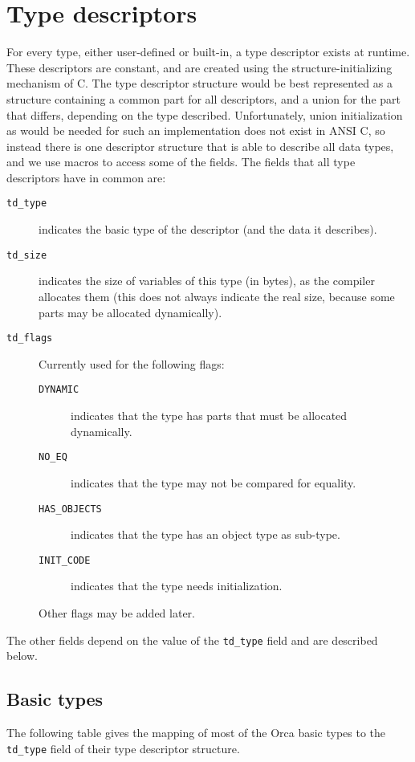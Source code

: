 \documentclass[10pt]{article}
\begin{document}
\section{Type descriptors}\label{sec:tpdesc}

For every type, either user-defined or built-in,
a type descriptor exists at runtime.
These descriptors are constant,
and are created using the structure-initializing mechanism of C.
The type descriptor structure would be best represented as a structure
containing a common part for all descriptors, and a union for the
part that differs, depending on the type described.
Unfortunately, union initialization as would be needed for 
such an implementation does not exist in
ANSI C, so instead there is one descriptor structure that is able to
describe all data types,
and we use macros to access some of the fields.
The fields that all type descriptors have in common are:
\begin{description}
\item[{\tt td\_type}]
indicates the basic type of the descriptor
(and the data it describes).
\item[{\tt td\_size}]
indicates the size of variables of this type (in bytes), as the compiler
allocates them (this does not always indicate the
real size, because some parts may be allocated dynamically).
\item[{\tt td\_flags}]
Currently used for the following flags:
\begin{description}
\item[{\tt DYNAMIC}]
indicates that the type has parts that must be allocated dynamically.
\item[{\tt NO\_EQ}]
indicates that the type may not be compared for equality.
\item[{\tt HAS\_OBJECTS}]
indicates that the type has an object type as sub-type.
\item[{\tt INIT\_CODE}]
indicates that the type needs initialization.
\end{description}
Other flags may be added later.
\end{description}
The other fields depend on the value of the \verb+td_type+
field and are described
below.

\subsection{Basic types}
The following table gives the mapping of most of the Orca basic types
to the \verb+td_type+
field of their type descriptor structure.
\end{document}
